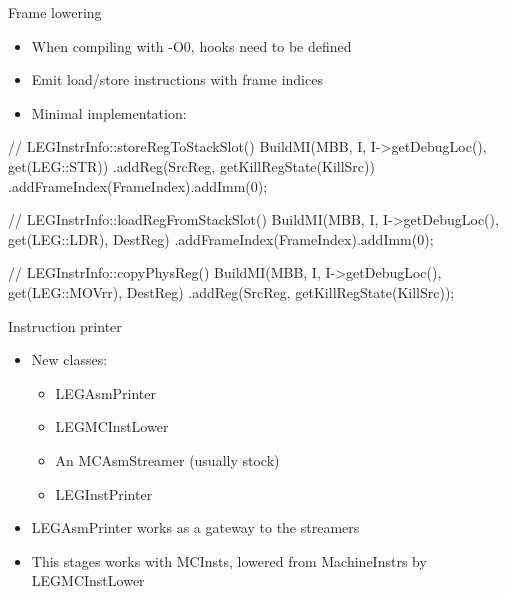 \begin{frame}[fragile]{Frame lowering}

\begin{itemize}
    \item When compiling with  -O0, hooks need to be defined
    \item Emit load/store instructions with frame indices
    \item Minimal implementation:
\end{itemize}

\begin{codebox}
// LEGInstrInfo::storeRegToStackSlot()
BuildMI(MBB, I, I->getDebugLoc(), get(LEG::STR))
  .addReg(SrcReg, getKillRegState(KillSrc))
  .addFrameIndex(FrameIndex).addImm(0);

// LEGInstrInfo::loadRegFromStackSlot()
BuildMI(MBB, I, I->getDebugLoc(), get(LEG::LDR), DestReg)
  .addFrameIndex(FrameIndex).addImm(0);

// LEGInstrInfo::copyPhysReg()
BuildMI(MBB, I, I->getDebugLoc(), get(LEG::MOVrr), DestReg)
  .addReg(SrcReg, getKillRegState(KillSrc));

\end{codebox}

\end{frame}


\begin{frame}{Instruction printer}

\begin{itemize}
    \item New classes:
    \begin{itemize}
        \item LEGAsmPrinter
        \item LEGMCInstLower
        \item An MCAsmStreamer (usually stock)
        \item LEGInstPrinter
    \end{itemize}
    \item LEGAsmPrinter works as a gateway to the streamers
    \item This stages works with MCInsts, lowered from MachineInstrs by LEGMCInstLower
\end{itemize}

\end{frame}


